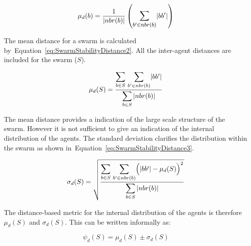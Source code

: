 \documentclass{ieeeaccess}
\begin{document}
\begin{equation}
\label{eq:SwarmStabilityDistance1}
\mu_d(b) = \frac{1}{\mathlarger{|nbr(b)|}}\left({\mathlarger{\sum_{b' \in nbr(b)}}|bb'|}\right)
\end{equation}

The mean distance for a swarm is calculated
by~Equation~\ref{eq:SwarmStabilityDistance2}. All the inter-agent distances are
included for the swarm ($S$). 


\begin{equation}
\label{eq:SwarmStabilityDistance2}
\mu_d(S) = \frac{\mathlarger{\sum_{b \in S}}~\mathlarger{\sum_{b' \in nbr(b)}}|bb'|}{\mathlarger{\sum_{b \in S}|nbr(b)|}}
\end{equation}

The mean distance provides a indication of the large scale structure of the
swarm. However it is not sufficient to give an indication of the internal
distribution of the agents. The standard deviation clarifies the distribution
within the swarm as shown in~Equation~\ref{eq:SwarmStabilityDistance3}. 


\begin{equation}
\label{eq:SwarmStabilityDistance3}
\sigma_d(S) = \sqrt{\frac{\mathlarger{\sum_{b \in S}}~\mathlarger{\sum_{b' \in nbr(b)}}\Big(|bb'| - \mu_d(S)\Big)^2}{\mathlarger{\sum_{b \in S}|nbr(b)|}}}
\end{equation}

The distance-based metric for the internal distribution of the agents is
therefore $\mu_d(S)$ and $\sigma_d(S)$. This can be written informally as:

\begin{equation}
\label{eq:SwarmDistanceMetric}
\psi_d(S) = \mu_d(S)\pm \sigma_d(S)
\end{equation}
\end{document}
